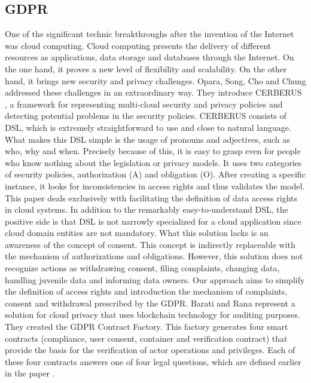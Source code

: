 \documentclass[11pt,english]{article}
\begin{document}
\subsection{GDPR}
One of the significant technic breakthroughs after the invention of the Internet was cloud computing. Cloud computing presents the delivery of different resources as applications, data storage and databases through the Internet. On the one hand, it proves a new level of flexibility and scalability. On the other hand, it brings new security and privacy challenges. \newline Opara, Song, Cho and Chung addressed these challenges in an extraordinary way. They introduce CERBERUS \cite{opara2019representing}, a framework for representing multi-cloud security and privacy policies and detecting potential problems in the security policies. CERBERUS consists of DSL, which is extremely straightforward to use and close to natural language. What makes this DSL simple is the usage of pronouns and adjectives, such as who, why and when. Precisely because of this, it is easy to grasp even for people who know nothing about the legislation or privacy models. It uses two categories of security policies, authorization (A) and obligation (O). After creating a specific instance, it looks for inconsistencies in access rights and thus validates the model. This paper deals exclusively with facilitating the definition of data access rights in cloud systems. In addition to the remarkably easy-to-understand DSL, the positive side is that DSL is not narrowly specialized for a cloud application since cloud domain entities are not mandatory. What this solution lacks is an awareness of the concept of consent. This concept is indirectly replaceable with the mechanism of authorizations and obligations. However, this solution does not recognize actions as withdrawing consent, filing complaints, changing data, handling juvenile data and informing data owners. Our approach aims to simplify the definition of access rights and introduction the mechanism of complaints, consent and withdrawal prescribed by the GDPR. Barati and Rana \cite{barati2020tracking} represent a solution for cloud privacy that uses blockchain technology for auditing purposes. They created the GDPR Contract Factory. This factory generates four smart contracts (compliance, user consent, container and veriﬁcation contract) that provide the basis for the veriﬁcation of actor operations and privileges. Each of these four contracts answers one of four legal questions, which are defined earlier in the paper \cite{corrales2018smart}. 
\end{document}
